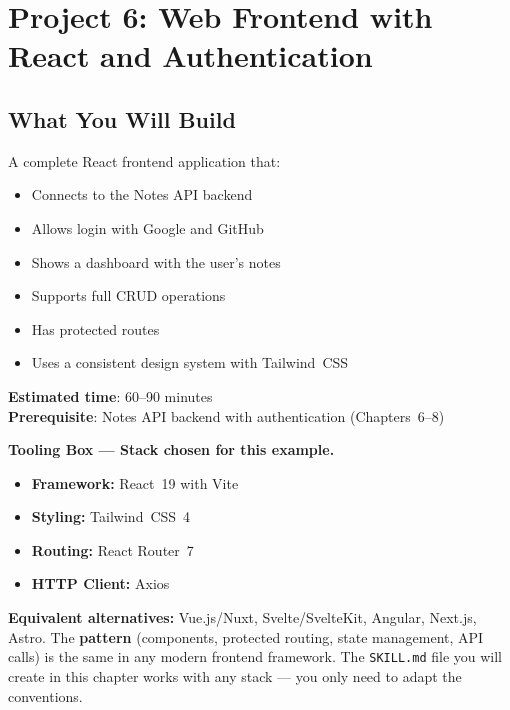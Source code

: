 \chapter{Project 6: Web Frontend with React and Authentication}

\section*{What You Will Build}
A complete React frontend application that:
\begin{itemize}
  \item Connects to the Notes API backend
  \item Allows login with Google and GitHub
  \item Shows a dashboard with the user's notes
  \item Supports full CRUD operations
  \item Has protected routes
  \item Uses a consistent design system with Tailwind~CSS
\end{itemize}

\textbf{Estimated time}: 60--90 minutes\\
\textbf{Prerequisite}: Notes API backend with authentication (Chapters~6--8)

\begin{notebox}
\textbf{Tooling Box --- Stack chosen for this example.}
\begin{itemize}
  \item \textbf{Framework:} React~19 with Vite
  \item \textbf{Styling:} Tailwind~CSS~4
  \item \textbf{Routing:} React Router~7
  \item \textbf{HTTP Client:} Axios
\end{itemize}
\textbf{Equivalent alternatives:} Vue.js/Nuxt, Svelte/SvelteKit, Angular, Next.js, Astro. The \textbf{pattern} (components, protected routing, state management, API calls) is the same in any modern frontend framework. The \texttt{SKILL.md} file you will create in this chapter works with any stack --- you only need to adapt the conventions.
\end{notebox}

